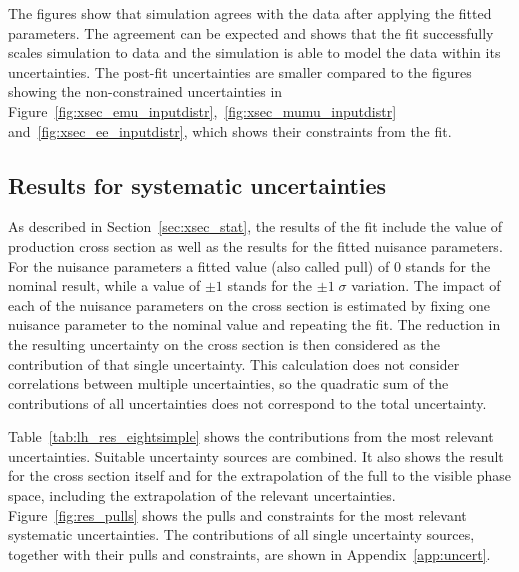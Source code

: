The figures show that simulation agrees with the data after applying the fitted parameters.
The agreement can be expected and shows that the fit successfully scales simulation to data and the
 simulation is able to model the data within its uncertainties.
The post-fit uncertainties are smaller compared to the figures showing the non-constrained uncertainties in Figure~\ref{fig:xsec_emu_inputdistr},~\ref{fig:xsec_mumu_inputdistr} and~\ref{fig:xsec_ee_inputdistr}, which
shows their constraints from the fit.


\subsection{Results for systematic uncertainties}
\label{sec:results_uncert}

As described in Section~\ref{sec:xsec_stat}, the results of the fit include the value of \ttbar production cross section as well as the results for the fitted nuisance parameters.
For the nuisance parameters a fitted value (also called pull) of $0$ stands for the nominal result, while a value of $\pm 1$ stands for the $\pm 1 \; \sigma$ variation.
The impact of each of the nuisance parameters on the cross section is estimated by fixing one nuisance parameter to the nominal value and repeating the fit.
The reduction in the resulting uncertainty on the cross section is then considered as the contribution of that single uncertainty. This calculation does not consider correlations between multiple uncertainties,
so the quadratic sum of the contributions of all uncertainties does not correspond to the total uncertainty.

Table~\ref{tab:lh_res_eightsimple} shows the contributions from the most relevant uncertainties. Suitable uncertainty sources are combined.
It also shows the result for the cross section itself and for the extrapolation of the full to the visible phase space, including the extrapolation of the relevant uncertainties.
Figure~\ref{fig:res_pulls} shows the pulls and constraints for the most relevant systematic uncertainties.
The contributions of all single uncertainty sources, together with their pulls and constraints, are shown in Appendix~\ref{app:uncert}.


